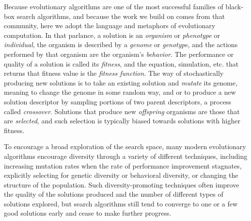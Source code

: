 \documentclass[twocolumn, DIV25, 9pt]{scrartcl}
\newcommand{\todoOfficialVersion}[1]{} %
\begin{document}
Because evolutionary algorithms are one of the most successful families of black-box search algorithms\cite{koza2003genetic, floreano2008bio}, and because the work we build on comes from that community, here we adopt the language and metaphors of evolutionary computation. In that parlance, a solution is an \emph{organism} or \emph{phenotype} or \emph{individual}, the organism is described by a \emph{genome} or \emph{genotype}, and the actions performed by that organism are the organism's \emph{behavior}. The performance or quality of a solution is called its \emph{fitness}, and the equation, simulation, etc. that returns that fitness value is the \emph{fitness function}. The way of stochastically producing new solutions is to take an existing solution and \emph{mutate} its genome, meaning to change the genome in some random way, and or to produce a new solution descriptor by sampling portions of two parent descriptors, a process called \emph{crossover}. Solutions that produce new \emph{offspring} organisms are those that are \emph{selected}, and such selection is typically biased towards solutions with higher fitness\cite{floreano2008bio}. 

To encourage a broad exploration of the search space, many modern evolutionary algorithms encourage diversity through a variety of different techniques, including increasing mutation rates when the rate of performance improvement stagnates\cite{clune2005investigations,eiben1999parameter, clune2008natural,floreano2008bio, russell1995artificial}, explicitly selecting for genetic diversity\cite{floreano2008bio, stanley2002evolving} or behavioral diversity\cite{lehman2011abandoning, lehman2011evolving, lehman2011novelty, lehman2008exploiting, Mouret2012}, or changing the structure of the population\cite{whitley1999island}.\todoOfficialVersion{People probably won't know what we mean by the previous clause} Such diversity-promoting techniques often improve the quality of the solutions produced and the number of different types of solutions explored, but search algorithms still tend to converge to one or a few good solutions early and cease to make further progress\cite{floreano2008bio, lehman2011abandoning, Mouret2012}.



%

\todoOfficialVersion{Decide if we want to specifically name/list/cite some of these older techniques. See email thread ``Restricted Tournament Selection''; [JBM] it does not hurt to cite a few papers on fitness sharing.}
\end{document}
